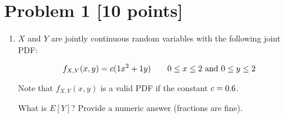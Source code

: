 \newpage
\section{Problem 1 [10 points]}

\begin{enumerate}[label=\alph*.]

\item $X$ and $Y$ are jointly continuous random variables with the following joint PDF:

\begin{equation}
f_{X,Y}(x,y) = c(1{} x^2 + 1{} y) \qquad 0 \leq x\leq 2{} \text{ and } 0 \leq y \leq 2{}
\end{equation}

Note that $f_{X,Y}(x,y)$ is a valid PDF if the constant $c = 0.6{}$.

What is $E[Y]$? Provide a numeric answer (fractions are fine).
	
		
		


\end{enumerate}